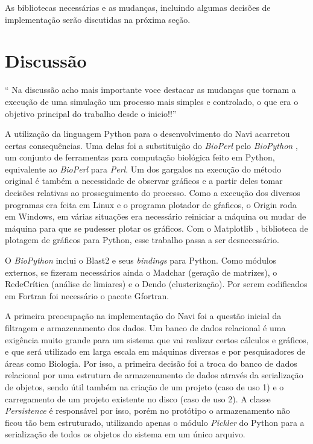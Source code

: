 As bibliotecas necessárias e as mudanças, incluindo algumas decisões de implementação serão discutidas na próxima seção.

\section{Discussão} \label{sec:discussao}

``
Na discussão acho mais importante voce destacar as mudanças que tornam a execução de uma simulação um processo mais simples e controlado,
o que era o objetivo principal do trabalho desde o inicio!!''

A utilização da linguagem Python para o desenvolvimento do Navi acarretou certas consequências. Uma delas foi a substituição do \textit{BioPerl} pelo
\textit{BioPython} \cite{biopython}, um conjunto de ferramentas para computação biológica feito em Python, equivalente ao \textit{BioPerl} para \textit{Perl}.
Um dos gargalos na execução do método original é também a necessidade de observar gráficos e a partir deles tomar decisões relativas ao prosseguimento do
processo. Como a execução dos diversos programas era feita em Linux e o programa plotador de gŕaficos, o Origin \cite{origin} roda em Windows, em várias
situações era necessário reiniciar a máquina ou mudar de máquina para que se pudesser plotar os gráficos. Com o Matplotlib \cite{matplotlib}, biblioteca de 
plotagem de gráficos para Python, esse trabalho passa a ser desnecessário.

O \textit{BioPython} inclui o Blast2 e seus \textit{bindings} para Python. Como módulos externos, se fizeram necessários ainda o Madchar (geração de matrizes),
o RedeCrítica (análise de limiares) e o Dendo (clusterização). Por serem codificados em Fortran foi necessário o pacote Gfortran.

A primeira preocupação na implementação do Navi foi a questão inicial da filtragem e armazenamento dos dados. Um banco de dados relacional é uma exigência
muito grande para um sistema que vai realizar certos cálculos e gráficos, e que será utilizado em larga escala em máquinas diversas e por pesquisadores de
áreas como Biologia. Por isso, a primeira decisão foi a troca do banco de dados relacional por uma estrutura de armazenamento de dados através da serialização
de objetos, sendo útil também na criação de um projeto (caso de uso 1) e o carregamento de um projeto existente no disco (caso de uso 2). A classe 
\textit{Persistence} é responsável por isso, porém no protótipo o armazenamento não ficou tão bem estruturado, utilizando apenas o módulo \textit{Pickler}
do Python para a serialização de todos os objetos do sistema em um único arquivo.

